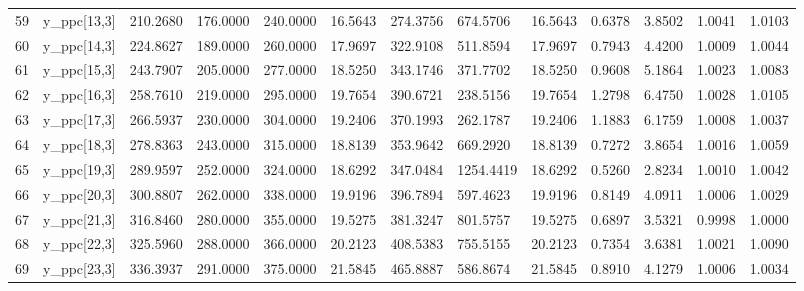 \begin{table}[ht]
\begin{tabular}{rllllllllllll}
  59 & y\_ppc[13,3] & 210.2680 & 176.0000 & 240.0000 & 16.5643 & 274.3756 &  674.5706 & 16.5643 & 0.6378 & 3.8502 & 1.0041 & 1.0103 \\ 
  60 & y\_ppc[14,3] & 224.8627 & 189.0000 & 260.0000 & 17.9697 & 322.9108 &  511.8594 & 17.9697 & 0.7943 & 4.4200 & 1.0009 & 1.0044 \\ 
  61 & y\_ppc[15,3] & 243.7907 & 205.0000 & 277.0000 & 18.5250 & 343.1746 &  371.7702 & 18.5250 & 0.9608 & 5.1864 & 1.0023 & 1.0083 \\ 
  62 & y\_ppc[16,3] & 258.7610 & 219.0000 & 295.0000 & 19.7654 & 390.6721 &  238.5156 & 19.7654 & 1.2798 & 6.4750 & 1.0028 & 1.0105 \\ 
  63 & y\_ppc[17,3] & 266.5937 & 230.0000 & 304.0000 & 19.2406 & 370.1993 &  262.1787 & 19.2406 & 1.1883 & 6.1759 & 1.0008 & 1.0037 \\ 
  64 & y\_ppc[18,3] & 278.8363 & 243.0000 & 315.0000 & 18.8139 & 353.9642 &  669.2920 & 18.8139 & 0.7272 & 3.8654 & 1.0016 & 1.0059 \\ 
  65 & y\_ppc[19,3] & 289.9597 & 252.0000 & 324.0000 & 18.6292 & 347.0484 & 1254.4419 & 18.6292 & 0.5260 & 2.8234 & 1.0010 & 1.0042 \\ 
  66 & y\_ppc[20,3] & 300.8807 & 262.0000 & 338.0000 & 19.9196 & 396.7894 &  597.4623 & 19.9196 & 0.8149 & 4.0911 & 1.0006 & 1.0029 \\ 
  67 & y\_ppc[21,3] & 316.8460 & 280.0000 & 355.0000 & 19.5275 & 381.3247 &  801.5757 & 19.5275 & 0.6897 & 3.5321 & 0.9998 & 1.0000 \\ 
  68 & y\_ppc[22,3] & 325.5960 & 288.0000 & 366.0000 & 20.2123 & 408.5383 &  755.5155 & 20.2123 & 0.7354 & 3.6381 & 1.0021 & 1.0090 \\ 
  69 & y\_ppc[23,3] & 336.3937 & 291.0000 & 375.0000 & 21.5845 & 465.8887 &  586.8674 & 21.5845 & 0.8910 & 4.1279 & 1.0006 & 1.0034 \\ 
   \hline
\end{tabular}
\end{table}
